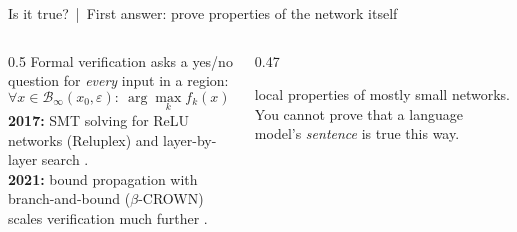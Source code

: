 \documentclass[aspectratio=169,10pt]{beamer}
\begin{document}
\begin{frame}{Is it true? \,|\, First answer: prove properties of the network itself}
\begin{columns}[T]
\begin{column}{0.5\textwidth}
{\footnotesize Formal verification asks a yes/no question for \emph{every} input in a region:}
\[\forall x\in\mathcal B_\infty(x_0,\varepsilon):\ \arg\max_k f_k(x)=y_0\ ?\]
{\footnotesize \textbf{2017:} SMT solving for ReLU networks (Reluplex) and layer-by-layer search .\\[2pt]
\textbf{2021:} bound propagation with branch-and-bound (\(\beta\)-CROWN) scales verification much further .}
\end{column}
\begin{column}{0.47\textwidth}
\begin{sfig}[0.55]
\end{sfig}
\vspace{2mm}

{\footnotesize{} local properties of mostly small networks. You cannot prove that a language model's \emph{sentence} is true this way.}
\end{column}
\end{columns}
\end{frame}
\end{document}
